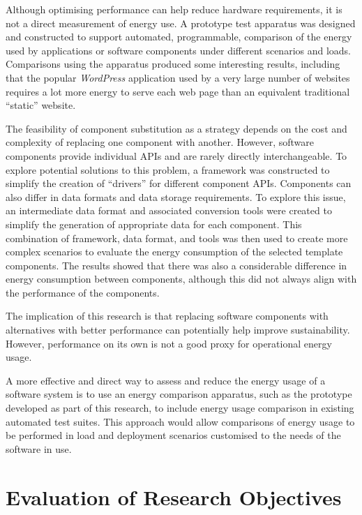 Although optimising performance can help reduce hardware requirements, it is not a direct measurement of energy use. A prototype test apparatus was designed and constructed to support automated, programmable, comparison of the energy used by applications or software components under different scenarios and loads. Comparisons using the apparatus produced some interesting results, including that the popular \emph{WordPress} application used by a very large number of websites requires a lot more energy to serve each web page than an equivalent traditional \enquote{static} website.

The feasibility of component substitution as a strategy depends on the cost and complexity of replacing one component with another. However, software components provide individual APIs and are rarely directly interchangeable. To explore potential solutions to this problem, a framework was constructed to simplify the creation of \enquote{drivers} for different component APIs. Components can also differ in data formats and data storage requirements. To explore this issue, an intermediate data format and associated conversion tools were created to simplify the generation of appropriate data for each component. This combination of framework, data format, and tools was then used to create more complex scenarios to evaluate the energy consumption of the selected template components. The results showed that there was also a considerable difference in energy consumption between components, although this did not always align with the performance of the components. 

The implication of this research is that replacing software components with alternatives with better performance can potentially help improve sustainability. However, performance on its own is not a good proxy for operational energy usage.

A more effective and direct way to assess and reduce the energy usage of a software system is to use an energy comparison apparatus, such as the prototype developed as part of this research, to include energy usage comparison in existing automated test suites. This approach would allow comparisons of energy usage to be performed in load and deployment scenarios customised to the needs of the software in use.

\section{Evaluation of Research Objectives}

